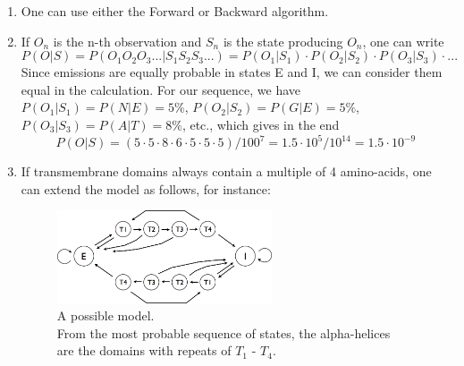 \documentclass[a4paper,11pt]{article}
\begin{document}
\begin{enumerate}
\item One can use either the Forward or Backward algorithm.

\item If $O_n$ is the n-th observation and $S_n$ is the state producing $O_n$, one can write 
$$P(O|S) = P(O_1O_2O_3... | S_1S_2S_3...) = P(O_1|S_1)\cdot P(O_2|S_2)\cdot P(O_3|S_3)\cdot ...$$
Since emissions are equally probable in states E and I, we can consider them equal in the calculation.
For our sequence, we have $P(O_1|S_1) = P(N|E) = 5\%$, $P(O_2|S_2) = P(G|E) = 5\%$, $P(O_3|S_3) = P(A|T) = 8\%$, etc.,
which gives in the end
$$P(O|S) = (5\cdot 5\cdot 8\cdot 6\cdot 5\cdot 5\cdot 5) / 100^{7} = 1.5\cdot 10^{5} / 10^{14} = 1.5\cdot 10^{-9}$$

\item If transmembrane domains always contain a multiple of 4 amino-acids, one can extend the model as follows, for instance:

\begin{figure}[hbt]
\centering
\includegraphics[width=0.6\textwidth]{figures/hmm_graph3.png}
\caption{A possible model. \\From the most probable sequence of states, the alpha-helices \\
are the domains with repeats of $T_1$ - $T_4$.}
\end{figure}


\end{enumerate}
\end{document}
